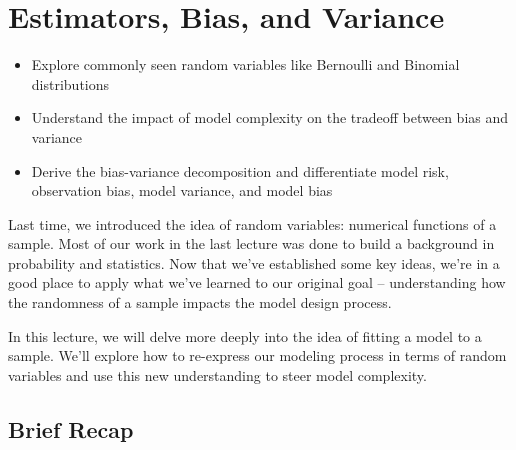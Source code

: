 \documentclass[
  letterpaper,
  DIV=11,
  numbers=noendperiod]{scrreprt}
\providecommand{\tightlist}{%
  \setlength{\itemsep}{0pt}\setlength{\parskip}{0pt}}\usepackage{longtable,booktabs,array}
\begin{document}

\chapter{Estimators, Bias, and
Variance}\label{estimators-bias-and-variance}

\begin{tcolorbox}[enhanced jigsaw, colback=white, arc=.35mm, toprule=.15mm, colframe=quarto-callout-note-color-frame, coltitle=black, opacitybacktitle=0.6, breakable, titlerule=0mm, leftrule=.75mm, left=2mm, opacityback=0, bottomtitle=1mm, rightrule=.15mm, colbacktitle=quarto-callout-note-color!10!white, bottomrule=.15mm, title=\textcolor{quarto-callout-note-color}{\faInfo}\hspace{0.5em}{Learning Outcomes}, toptitle=1mm]

\begin{itemize}
\tightlist
\item
  Explore commonly seen random variables like Bernoulli and Binomial
  distributions
\item
  Understand the impact of model complexity on the tradeoff between bias
  and variance
\item
  Derive the bias-variance decomposition and differentiate model risk,
  observation bias, model variance, and model bias
\end{itemize}

\end{tcolorbox}

Last time, we introduced the idea of random variables: numerical
functions of a sample. Most of our work in the last lecture was done to
build a background in probability and statistics. Now that we've
established some key ideas, we're in a good place to apply what we've
learned to our original goal -- understanding how the randomness of a
sample impacts the model design process.

In this lecture, we will delve more deeply into the idea of fitting a
model to a sample. We'll explore how to re-express our modeling process
in terms of random variables and use this new understanding to steer
model complexity.

\section{Brief Recap}\label{brief-recap}
\end{document}
